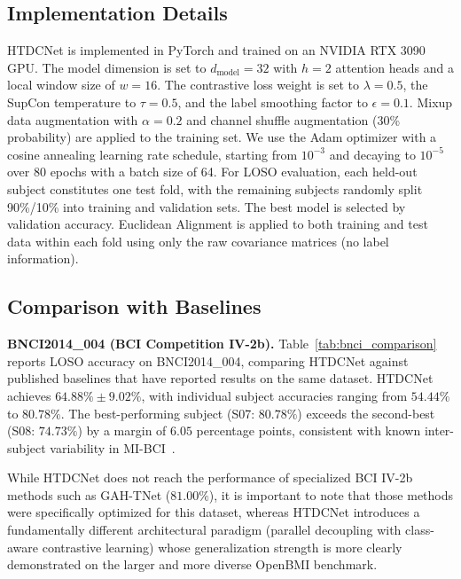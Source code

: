 \documentclass[conference]{IEEEtran}
\begin{document}
\subsection{Implementation Details}
HTDCNet is implemented in PyTorch and trained on an NVIDIA RTX 3090 GPU.
The model dimension is set to $d_{\text{model}}=32$ with $h=2$ attention heads and a local window size of $w=16$.
The contrastive loss weight is set to $\lambda=0.5$, the SupCon temperature to $\tau=0.5$, and the label smoothing factor to $\epsilon=0.1$.
Mixup data augmentation with $\alpha=0.2$ and channel shuffle augmentation (30\% probability) are applied to the training set.
We use the Adam optimizer with a cosine annealing learning rate schedule, starting from $10^{-3}$ and decaying to $10^{-5}$ over 80 epochs with a batch size of 64.
For LOSO evaluation, each held-out subject constitutes one test fold, with the remaining subjects randomly split 90\%/10\% into training and validation sets.
The best model is selected by validation accuracy.
Euclidean Alignment is applied to both training and test data within each fold using only the raw covariance matrices (no label information).

\subsection{Comparison with Baselines}

\textbf{BNCI2014\_004 (BCI Competition IV-2b).}
Table~\ref{tab:bnci_comparison} reports LOSO accuracy on BNCI2014\_004, comparing HTDCNet against published baselines that have reported results on the same dataset.
HTDCNet achieves $64.88\% \pm 9.02\%$, with individual subject accuracies ranging from $54.44\%$ to $80.78\%$.
The best-performing subject (S07: $80.78\%$) exceeds the second-best (S08: $74.73\%$) by a margin of $6.05$ percentage points, consistent with known inter-subject variability in MI-BCI~\cite{lotte2018review}.

While HTDCNet does not reach the performance of specialized BCI IV-2b methods such as GAH-TNet ($81.00\%$), it is important to note that those methods were specifically optimized for this dataset, whereas HTDCNet introduces a fundamentally different architectural paradigm (parallel decoupling with class-aware contrastive learning) whose generalization strength is more clearly demonstrated on the larger and more diverse OpenBMI benchmark.
\end{document}
